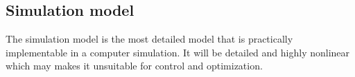 \subsection{Simulation model}

The simulation model is the most detailed model that is practically implementable in a computer simulation. It will be detailed and highly nonlinear which may makes it unsuitable for control and optimization.
















